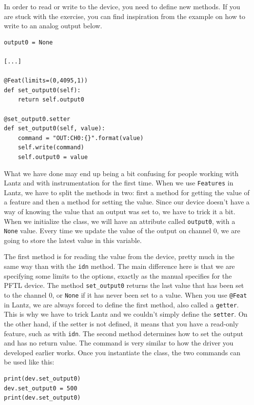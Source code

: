 In order to read or write to the device, you need to define new methods.
If you are stuck with the exercise, you can find inspiration from the
example on how to write to an analog output below.

\begin{verbatim}
output0 = None

[...]

@Feat(limits=(0,4095,1))
def set_output0(self):
    return self.output0

@set_output0.setter
def set_output0(self, value):
    command = "OUT:CH0:{}".format(value)
    self.write(command)
    self.output0 = value
\end{verbatim}

What we have done may end up being a bit confusing for people working with
Lantz and with instrumentation for the first time. When we use
\texttt{Features} in Lantz, we have to split the methods in two: first a
method for getting the value of a feature and then a method for setting
the value. Since our device doesn't have a way of knowing the value that
an output was set to, we have to trick it a bit. When we initialize the
class, we will have an attribute called \texttt{output0}, with a
\texttt{None} value. Every time we update the value of the output on
channel 0, we are going to store the latest value in this variable.

The first method is for reading the value from the device, pretty much
in the same way than with the \texttt{idn} method. The main difference
here is that we are specifying some limits to the options, exactly as
the manual specifies for the {PFTL} device. The method
\texttt{set_output0} returns the last value that has been set to the
channel 0, or \texttt{None} if it has never been set to a value. When
you use \texttt{@Feat} in Lantz, we are always forced to define the
first method, also called a \texttt{getter}. This is why we have to
trick Lantz and we couldn't simply define the \texttt{setter}. On the
other hand, if the setter is not defined, it means that you have a
read-only feature, such as with \texttt{idn}. The second method
determines how to set the output and has no return value. The command is
very similar to how the driver you developed earlier works. Once you
instantiate the class, the two commands can be used like this:

\begin{verbatim}
print(dev.set_output0)
dev.set_output0 = 500
print(dev.set_output0)
\end{verbatim}

